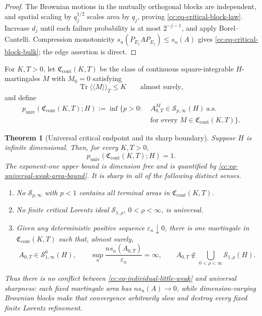 \documentclass[10pt,reqno]{amsart}
\theoremstyle{plain}
\newtheorem{theorem}{Theorem}[section]
\theoremstyle{definition}
\theoremstyle{remark}
\begin{document}
\begin{proof}
The Brownian motions in the mutually orthogonal blocks are independent,
and spatial scaling by \(q_j^{1/2}\) scales area by \(q_j\), proving
\eqref{cc:eq-critical-block-law}.  Increase \(d_j\) until each failure
probability is at most \(2^{-j-1}\), and apply Borel--Cantelli.  Compression
monotonicity \(s_n(P_{E_j}AP_{E_j})\leq s_n(A)\) gives
\eqref{cc:eq-critical-block-bulk}; the edge assertion is direct.
\end{proof}

For \(K,T>0\), let \(\mathfrak C_{\mathrm{cont}}(K,T)\) be the class of
continuous square-integrable \(H\)-martingales \(M\) with \(M_0=0\)
satisfying
\[
 \operatorname{Tr}\langle\!\langle M\rangle\!\rangle_T\leq K
 \qquad\text{almost surely},
\]
and define
\[
 \begin{aligned}
 p_{\mathrm{univ}}(\mathfrak C_{\mathrm{cont}}(K,T);H)
 :=\inf\{p>0:\;&A^M_{0,T}\in\mathcal S_{p,\infty}(H)\ \text{a.s.}\\
              &\text{for every }M\in\mathfrak C_{\mathrm{cont}}(K,T)\}.
 \end{aligned}
\]

\begin{theorem}[Universal critical endpoint and its sharp boundary]
\label{cc:thm-universal-critical-endpoint}
Suppose \(H\) is infinite dimensional.  Then, for every \(K,T>0\),
\begin{equation}
 p_{\mathrm{univ}}(\mathfrak C_{\mathrm{cont}}(K,T);H)=1.
 \label{cc:eq-critical-universal-exponent}
\end{equation}
The exponent-one upper bound is dimension free and is quantified by
\eqref{cc:eq-universal-weak-area-bound}.  It is sharp in all of the
following distinct senses.
\begin{enumerate}[label=\textup{(\roman*)},leftmargin=2.8em]
\item No \(\mathcal S_{p,\infty}\) with \(p<1\) contains all terminal
areas in \(\mathfrak C_{\mathrm{cont}}(K,T)\).
\item No finite critical Lorentz ideal \(\mathcal S_{1,\rho}\),
\(0<\rho<\infty\), is universal.
\item Given any deterministic positive sequence
\(\varepsilon_n\downarrow0\), there is one
martingale in \(\mathfrak C_{\mathrm{cont}}(K,T)\) such that, almost surely,
\begin{equation}
 A_{0,T}\in\mathcal S^0_{1,\infty}(H),\qquad
 \sup_n\frac{n s_n(A_{0,T})}{\varepsilon_n}=\infty,
 \qquad
 A_{0,T}\notin\bigcup_{0<\rho<\infty}\mathcal S_{1,\rho}(H).
 \label{cc:eq-critical-no-uniform-little-modulus}
\end{equation}
\end{enumerate}
Thus there is no conflict between
\eqref{cc:eq-individual-little-weak} and universal sharpness: each fixed
martingale area has \(ns_n(A)\to0\), while dimension-varying Brownian
blocks make that convergence arbitrarily slow and destroy every fixed
finite Lorentz refinement.
\end{theorem}
\end{document}
